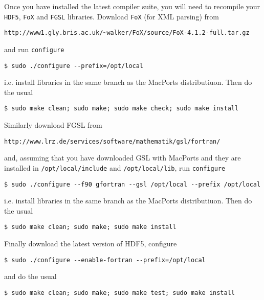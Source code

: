 Once you have installed the latest compiler suite, you will need to recompile your {\tt HDF5}, {\tt FoX} and {\tt FGSL} libraries. Download {\tt FoX} (for XML parsing) from

\begin{verbatim}
http://www1.gly.bris.ac.uk/~walker/FoX/source/FoX-4.1.2-full.tar.gz
\end{verbatim}

and run {\tt configure}

\begin{verbatim}
$ sudo ./configure --prefix=/opt/local
\end{verbatim}

i.e. install libraries in the same branch as the MacPorts distributiuon. Then do the usual

\begin{verbatim}
$ sudo make clean; sudo make; sudo make check; sudo make install
\end{verbatim}

Similarly download FGSL from

\begin{verbatim}
http://www.lrz.de/services/software/mathematik/gsl/fortran/
\end{verbatim}

and, assuming that you have downloaded GSL with MacPorts and they are installed in {\tt /opt/local/include} and {\tt /opt/local/lib}, run {\tt configure}

\begin{verbatim}
$ sudo ./configure --f90 gfortran --gsl /opt/local --prefix /opt/local
\end{verbatim}

i.e. install libraries in the same branch as the MacPorts distributiuon. Then do the usual

\begin{verbatim}
$ sudo make clean; sudo make; sudo make install
\end{verbatim}

Finally download the latest version of HDF5, configure

\begin{verbatim}
$ sudo ./configure --enable-fortran --prefix=/opt/local
\end{verbatim}

and do the usual

\begin{verbatim}
$ sudo make clean; sudo make; sudo make test; sudo make install
\end{verbatim}


